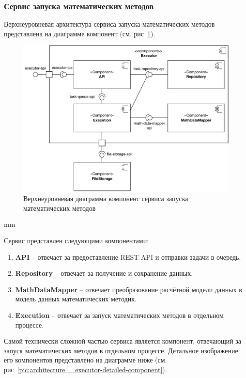 \subsubsection{\large{Сервис запуска математических методов}}

Верхнеуровневая архитектура сервиса запуска математических методов представлена на диаграмме компонент
(см. рис\ \ref{pic:architecture__executor-component}).

\begin{figure}[H]
	\hspace*{-2.5 cm}\includegraphics[width=\textwidth]{architecture/pictures/executor/component_common}
	\caption{Верхнеуровневая диаграмма компонент сервиса запуска математических методов}
	\label{pic:architecture__executor-component}
\end{figure}
 mm

Сервис представлен следующими компонентами:
\begin{enumerate}
	\item {
		\textbf{API} -- отвечает за предоставление REST API и отправки задачи в очередь.
	}
	\item {
		\textbf{Repository} -- отвечает за получение и сохранение данных.
	}
	\item {
		\textbf{MathDataMapper} -- отвечает преобразование расчётной модели данных в модель данных математических методик.
	}
	\item {
		\textbf{Execution} -- отвечает за запуск математических методов в отдельном процессе.
	}
\end{enumerate}

Самой технически сложной частью сервиса является компонент, отвечающий за запуск математических методов
в отдельном процессе. Детальное изображение его компонентов представлено
на диаграмме ниже (см. рис\ \ref{pic:architecture__executor-detailed-component}).

